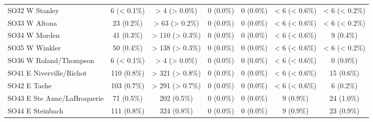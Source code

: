 \documentclass{article}
\begin{document}
\begin{table}[htbp]
\begin{longtable}{l*{6}{c}}
  SO32 W Stanley                                        &           6 (< 0.1\%)           &          > 4 (> 0.0\%)          &            0 (0.0\%)            &            0 (0.0\%)            &          < 6 (< 0.6\%)          &          < 6 (< 0.2\%)          \\
  SO33 W Altona                                         &            23 (0.2\%)           &          > 63 (> 0.2\%)         &            0 (0.0\%)            &            0 (0.0\%)            &          < 6 (< 0.6\%)          &          < 6 (< 0.2\%)          \\
  SO34 W Morden                                         &            41 (0.3\%)           &         > 110 (> 0.3\%)         &            0 (0.0\%)            &            0 (0.0\%)            &          < 6 (< 0.6\%)          &            9 (0.4\%)            \\
  SO35 W Winkler                                        &            50 (0.4\%)           &         > 138 (> 0.3\%)         &            0 (0.0\%)            &            0 (0.0\%)            &          < 6 (< 0.6\%)          &          < 6 (< 0.2\%)          \\
  SO36 W Roland/Thompson                                &           6 (< 0.1\%)           &          > 4 (> 0.0\%)          &            0 (0.0\%)            &            0 (0.0\%)            &          < 6 (< 0.6\%)          &            0 (0.0\%)            \\
  SO41 E Niverville/Richot                              &           110 (0.8\%)           &         > 321 (> 0.8\%)         &            0 (0.0\%)            &            0 (0.0\%)            &          < 6 (< 0.6\%)          &            15 (0.6\%)           \\
  SO42 E Tache                                          &           103 (0.7\%)           &         > 291 (> 0.7\%)         &            0 (0.0\%)            &            0 (0.0\%)            &          < 6 (< 0.6\%)          &            6 (0.2\%)            \\
  SO43 E Ste Anne/LaBroquerie                           &            71 (0.5\%)           &           202 (0.5\%)           &            0 (0.0\%)            &            0 (0.0\%)            &            9 (0.9\%)            &            24 (1.0\%)           \\
  SO44 E Steinbach                                      &           111 (0.8\%)           &           324 (0.8\%)           &            0 (0.0\%)            &            0 (0.0\%)            &            9 (0.9\%)            &            23 (0.9\%)           \\

\end{longtable}
\end{table}
\end{document}
